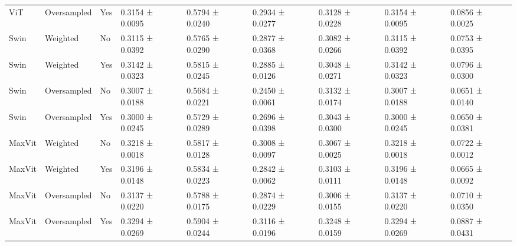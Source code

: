 \documentclass[a4paper,10pt]{book}
\begin{document}
\begin{scriptsize}
\begin{longtable}{@{}l l p{0.5cm} p{1.2cm} p{1.2cm} p{1.2cm} p{1.2cm} p{1.2cm} p{1.2cm}@{}}
            ViT & Oversampled & Yes & 0.3154 ± 0.0095 & 0.5794 ± 0.0240 & 0.2934 ± 0.0277 & 0.3128 ± 0.0228 & 0.3154 ± 0.0095 & 0.0856 ± 0.0025 \\ 
            Swin & Weighted & No & 0.3115 ± 0.0392 & 0.5765 ± 0.0290 & 0.2877 ± 0.0368 & 0.3082 ± 0.0266 & 0.3115 ± 0.0392 & 0.0753 ± 0.0395 \\ 
            Swin & Weighted & Yes & 0.3142 ± 0.0323 & 0.5815 ± 0.0245 & 0.2885 ± 0.0126 & 0.3048 ± 0.0271 & 0.3142 ± 0.0323 & 0.0796 ± 0.0300 \\ 
            Swin & Oversampled & No & 0.3007 ± 0.0188 & 0.5684 ± 0.0221 & 0.2450 ± 0.0061 & 0.3132 ± 0.0174 & 0.3007 ± 0.0188 & 0.0651 ± 0.0140 \\ 
            Swin & Oversampled & Yes & 0.3000 ± 0.0245 & 0.5729 ± 0.0289 & 0.2696 ± 0.0398 & 0.3043 ± 0.0300 & 0.3000 ± 0.0245 & 0.0650 ± 0.0381 \\ 
            MaxVit & Weighted & No & 0.3218 ± 0.0018 & 0.5817 ± 0.0128 & 0.3008 ± 0.0097 & 0.3067 ± 0.0025 & 0.3218 ± 0.0018 & 0.0722 ± 0.0012 \\ 
            MaxVit & Weighted & Yes & 0.3196 ± 0.0148 & 0.5834 ± 0.0223 & 0.2842 ± 0.0062 & 0.3103 ± 0.0111 & 0.3196 ± 0.0148 & 0.0665 ± 0.0092 \\ 
            MaxVit & Oversampled & No & 0.3137 ± 0.0220 & 0.5788 ± 0.0175 & 0.2874 ± 0.0229 & 0.3006 ± 0.0155 & 0.3137 ± 0.0220 & 0.0710 ± 0.0350 \\ 
            MaxVit & Oversampled & Yes & 0.3294 ± 0.0269 & 0.5904 ± 0.0244 & 0.3116 ± 0.0196 & 0.3248 ± 0.0159 & 0.3294 ± 0.0269 & 0.0887 ± 0.0431 \\ 
\end{longtable}
\end{scriptsize}
\end{document}
